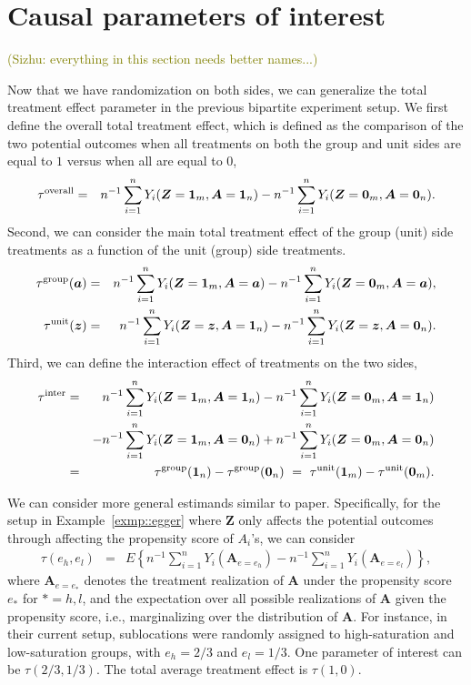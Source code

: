 \documentclass{article}
\newcommand{\bOneZ}{\boldsymbol{1}_{m}}
\newcommand{\bZeroZ}{\boldsymbol{0}_{m}}
\newcommand{\bOneA}{\boldsymbol{1}_{n}}
\newcommand{\bZeroA}{\boldsymbol{0}_{n}}
\newcommand{\bz}{\boldsymbol{z}}
\newcommand{\bZ}{\boldsymbol{Z}}
\newcommand{\ba}{\boldsymbol{a}}
\newcommand{\bA}{\boldsymbol{A}}
\newcommand{\sumi}{\sum_{i=1}^n}
\newcommand{\sz}[1]{{\textcolor{olive}{(Sizhu: #1)}}}
\begin{document}
\section{Causal parameters of interest}
\sz{everything in this section needs better names...}

Now that we have randomization on both sides, we can generalize the total treatment effect parameter in the previous bipartite experiment setup. We first define the overall total treatment effect, which is defined as the comparison of the two potential outcomes when all treatments on both the group and unit sides are equal to $1$ versus when all are equal to $0$,
\begin{eqnarray*}
    \tau^{\textup{overall}} &=& n^{-1} \sumi Y_{i}(\bZ=\bOneZ, \bA=\bOneA) - n^{-1} \sumi Y_{i}(\bZ=\bZeroZ, \bA=\bZeroA).
\end{eqnarray*}
Second, we can consider the main total treatment effect of the group (unit) side treatments as a function of the unit (group) side treatments.
\begin{eqnarray*}
    \tau^{\textup{group}}(\ba) &=& n^{-1} \sumi Y_{i}(\bZ=\bOneZ, \bA=\ba) - n^{-1} \sumi Y_{i}(\bZ=\bZeroZ, \bA=\ba), \\
    \tau^{\textup{unit}}(\bz) &=& n^{-1} \sumi Y_{i}(\bZ=\bz, \bA=\bOneA) - n^{-1} \sumi Y_{i}(\bZ=\bz, \bA=\bZeroA).
\end{eqnarray*}
Third, we can define the interaction effect of treatments on the two sides,
\begin{eqnarray*}
    \tau^{\textup{inter}} &=& n^{-1} \sumi Y_{i}(\bZ=\bOneZ, \bA=\bOneA) - n^{-1} \sumi Y_{i}(\bZ=\bZeroZ, \bA=\bOneA) \\
    &&- n^{-1} \sumi Y_{i}(\bZ=\bOneZ, \bA=\bZeroA) + n^{-1} \sumi Y_{i}(\bZ=\bZeroZ, \bA=\bZeroA) \\
    &=& \tau^{\textup{group}}(\bOneA) - \tau^{\textup{group}}(\bZeroA) \ =\  \tau^{\textup{unit}}(\bOneZ) - \tau^{\textup{unit}}(\bZeroZ).
\end{eqnarray*}

We can consider more general estimands similar to \cite{hudgens2008toward} paper. Specifically, for the setup in Example~\ref{exmp::egger} where $\bZ$ only affects the potential outcomes through affecting the propensity score of $A_i$'s, we can consider
\begin{eqnarray*}
    \tau(e_h,e_l) &=& E\left\{n^{-1}\sumi Y_i(\bA_{e=e_h}) - n^{-1}\sumi Y_i(\bA_{e=e_l})\right\},
\end{eqnarray*}
where $\bA_{e=e_*}$ denotes the treatment realization of $\bA$ under the propensity score $e_*$ for $*=h,l$, and the expectation over all possible realizations of $\bA$ given the propensity score, i.e., marginalizing over the distribution of $\bA$. For instance, in their current setup, sublocations were randomly assigned to high-saturation and low-saturation groups, with $e_h=2/3$ and $e_l=1/3$. One parameter of interest can be $\tau(2/3,1/3)$. The total average treatment effect is $\tau(1,0)$.
\end{document}
